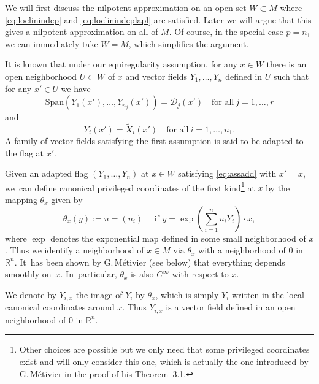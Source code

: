 \documentclass[11pt]{article}
\theoremstyle{definition}
\newcommand{\1}{\mathbbm{1}}
\newcommand{\R}{\mathbb{R}}
\numberwithin{equation}{section}
\begin{document}
We will first discuss the nilpotent approximation on an open set $W\subset M$ where \eqref{eq:loclinindep} and \eqref{eq:loclinindeplapl} are satisfied. Later we will argue that this gives a nilpotent approximation on all of $M$. Of course, in the special case $p=n_1$ we can immediately take $W=M$, which simplifies the argument.

It is known that under our equiregularity assumption, for any $x\in W$ there is an open neighborhood $U\subset W$ of $x$ and vector fields $Y_1,\ldots,Y_n$ defined in $U$ such that for any $x'\in U$ we have
\[
\text{Span}(Y_1(x'),\ldots,Y_{n_j}(x'))=\mathcal{D}_j(x')
\quad\text{for all}\ j=1,\ldots, r
\]
and
\begin{equation}\label{eq:assadd}
Y_i(x') =\tilde X_i(x') \quad\text{for all}\ i=1,\ldots,n_1.
\end{equation}
A family of vector fields satisfying the first assumption is said to be adapted to the flag at $x'$.

Given an adapted flag $(Y_1,\ldots,Y_n)$ at $x\in W$ satisfying \eqref{eq:assadd} with $x'=x$, we~can define canonical privileged coordinates of the first kind\footnote{Other choices are possible but we only need that some privileged coordinates exist and will only consider this one, which is actually the one introduced by G.\,Métivier \cite{Me} in the proof of his Theorem~3.1.} at $x$ by the mapping $\theta_x$ given by
\begin{equation} \label{eq:pc}
\theta_x (y) := u = (u_{i}) \quad\mbox{ if } y = \exp (\sum_{i=1}^n u_{i}Y_i) \cdot x,
\end{equation} where $\exp$ denotes the exponential map defined in some small neighborhood of $x$.
Thus we identify a neighborhood of $x\in M$ via $\theta_x$ with a neighborhood of $0$ in $\mathbb R^n$. It~has been shown by G.\,Métivier (see below) that everything depends smoothly on~$x$. In~particular, $\theta_x$ is also $C^\infty$ with respect to $x$.

We denote by $Y_{i,x}$ the image of $Y_i$ by $\theta_x$,
which is simply $Y_i$ written in the local canonical coordinates around $x$. Thus $Y_{i,x}$ is a vector field defined in an open neighborhood of $0$ in $\R^n$.
\end{document}
